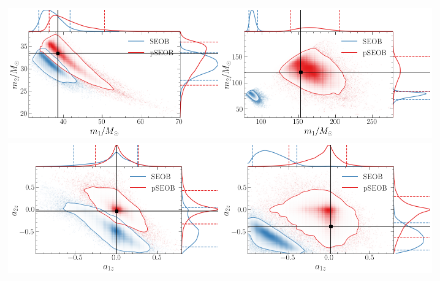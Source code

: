 \documentclass[twocolumn,prd,superscriptaddress,amsfonts,amssymb,amsmath,preprintnumbers]{revtex4-1}
\begin{document}

\begin{figure}%
	\includegraphics[width=0.5\textwidth]{figures/GW150914_simulated_signal_0p5_gr_ngr_m1m2.png}\includegraphics[width=0.5\textwidth]{figures/GW190521_simulated_signal_0p5_gr_ngr_m1m2.png}
	\includegraphics[width=0.5\textwidth]{figures/GW150914_simulated_signal_0p5_gr_ngr_a1za2z.png}\includegraphics[width=0.5\textwidth]{figures/GW190521_simulated_signal_0p5_gr_ngr_a1za2z.png}	

\end{figure}
\end{document}
